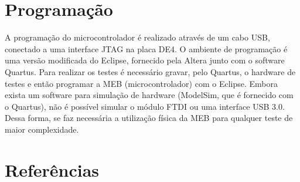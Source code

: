 \chapter{Programação}
  A programação do microcontrolador é realizado através de um cabo USB, conectado a uma interface JTAG na placa DE4. O ambiente de programação é uma versão modificada do Eclipse, fornecido pela Altera junto com o software Quartus. Para realizar os testes é necessário gravar, pelo Quartus, o hardware de testes e então programar a MEB (microcontrolador) com o Eclipse.
  Embora exista um software para simulação de hardware (ModelSim, que é fornecido com o Quartus), não é possível simular o módulo FTDI ou uma interface USB 3.0. Dessa forma, se faz necessária a utilização física da MEB para qualquer teste de maior complexidade.
  
\chapter{Referências}
